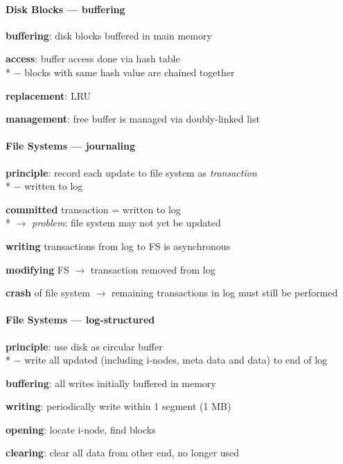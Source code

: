 \paragraph{Disk Blocks --- buffering}
\begin{items}
  \item \textbf{buffering}: disk blocks buffered in main memory
  \item \textbf{access}: buffer access done via hash table \\*
    $ - $ blocks with same hash value are chained together
  \item \textbf{replacement}: LRU
  \item \textbf{management}: free buffer is managed via doubly-linked list
\end{items}

\paragraph{File Systems --- journaling}
\begin{items}
  \item \textbf{principle}: record each update to file system as \emph{transaction} \\*
    $ - $ written to log
  \item \textbf{committed} transaction = written to log \\*
    $ \to $ \emph{problem}: file system may not yet be updated
  \item \textbf{writing} transactions from log to FS is asynchronous
  \item \textbf{modifying} FS $ \to $ transaction removed from log
  \item \textbf{crash} of file system $ \to $ remaining transactions in log must still be performed
\end{items}

\paragraph{File Systems --- log-structured}
\begin{items}
  \item \textbf{principle}: use disk as circular buffer \\*
    $ - $ write all updated (including i-nodes, meta data and data) to end of log
  \item \textbf{buffering}: all writes initially buffered in memory
  \item \textbf{writing}: periodically write within 1 segment (1 MB)
  \item \textbf{opening}: locate i-node, find blocks
  \item \textbf{clearing}: clear all data from other end, no longer used
\end{items}